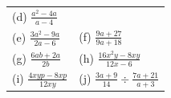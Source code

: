 \begin{enumerate}[noitemsep, label=\textbf{\arabic*}. ]
{\begin{tabular}[t]{|l|l|}
        (d) $\frac{{a}^{2}-4a}{a-4}$\hspace{1ex}%
     \tabularnewline\cline{1-1}\cline{2-2}
        (e) $\frac{3{a}^{2}-9a}{2a-6}$\hspace{1ex} &
        (f) $\frac{9a+27}{9a+18}$\hspace{1ex}%
     \tabularnewline\cline{1-1}\cline{2-2}
        (g) $\frac{6ab+2a}{2b}$\hspace{1ex} &
        (h) $\frac{16{x}^{2}y-8xy}{12x-6}$\hspace{1ex}%
     \tabularnewline\cline{1-1}\cline{2-2}
        (i) $\frac{4xyp-8xp}{12xy}$\hspace{1ex} &
        (j) $\frac{3a+9}{14}÷\frac{7a+21}{a+3}$\hspace{1ex}%
     \tabularnewline\cline{1-1}\cline{2-2}

\end{tabular}}
\end{enumerate}
